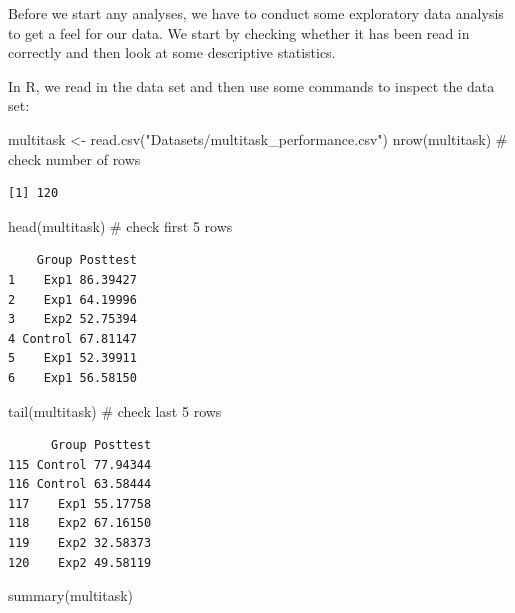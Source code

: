 \documentclass[
  letterpaper,
]{book}
\newenvironment{Shaded}{\begin{snugshade}}{\end{snugshade}}
\newcommand{\CommentTok}[1]{\textcolor[rgb]{0.37,0.37,0.37}{#1}}
\newcommand{\FunctionTok}[1]{\textcolor[rgb]{0.28,0.35,0.67}{#1}}
\newcommand{\NormalTok}[1]{\textcolor[rgb]{0.00,0.23,0.31}{#1}}
\newcommand{\OtherTok}[1]{\textcolor[rgb]{0.00,0.23,0.31}{#1}}
\newcommand{\StringTok}[1]{\textcolor[rgb]{0.13,0.47,0.30}{#1}}
\begin{document}
Before we start any analyses, we have to conduct some exploratory data
analysis to get a feel for our data. We start by checking whether it has
been read in correctly and then look at some descriptive statistics.

In R, we read in the data set and then use some commands to inspect the
data set:

\begin{Shaded}
\begin{Highlighting}[]
\NormalTok{multitask }\OtherTok{\textless{}{-}} \FunctionTok{read.csv}\NormalTok{(}\StringTok{"Datasets/multitask\_performance.csv"}\NormalTok{)}
\FunctionTok{nrow}\NormalTok{(multitask) }\CommentTok{\# check number of rows}
\end{Highlighting}
\end{Shaded}

\begin{verbatim}
[1] 120
\end{verbatim}

\begin{Shaded}
\begin{Highlighting}[]
\FunctionTok{head}\NormalTok{(multitask) }\CommentTok{\# check first 5 rows }
\end{Highlighting}
\end{Shaded}

\begin{verbatim}
    Group Posttest
1    Exp1 86.39427
2    Exp1 64.19996
3    Exp2 52.75394
4 Control 67.81147
5    Exp1 52.39911
6    Exp1 56.58150
\end{verbatim}

\begin{Shaded}
\begin{Highlighting}[]
\FunctionTok{tail}\NormalTok{(multitask) }\CommentTok{\# check last 5 rows }
\end{Highlighting}
\end{Shaded}

\begin{verbatim}
      Group Posttest
115 Control 77.94344
116 Control 63.58444
117    Exp1 55.17758
118    Exp2 67.16150
119    Exp2 32.58373
120    Exp2 49.58119
\end{verbatim}

\begin{Shaded}
\begin{Highlighting}[]
\FunctionTok{summary}\NormalTok{(multitask)}
\end{Highlighting}
\end{Shaded}
\end{document}
